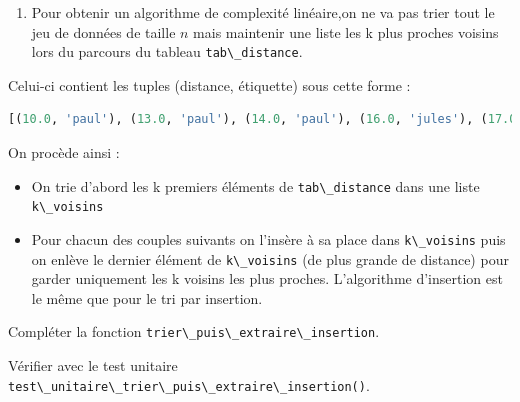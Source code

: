 \documentclass[
  11pt,
]{article}
\newcommand{\passthrough}[1]{#1}
\providecommand{\tightlist}{%
  \setlength{\itemsep}{0pt}\setlength{\parskip}{0pt}}
\newcounter{thme}
\newcounter{def}
\newcounter{cours}
\newcounter{alg}
\begin{document}
\begin{enumerate}
\def\labelenumi{\arabic{enumi}.}
\setcounter{enumi}{4}
\tightlist
\item
  Pour obtenir un algorithme de complexité linéaire,on ne va pas trier
  tout le jeu de données de taille \(n\) mais maintenir une liste les k
  plus proches voisins lors du parcours du tableau
  \passthrough{\lstinline!tab\_distance!}.
\end{enumerate}

Celui-ci contient les tuples (distance, étiquette) sous cette forme :

\begin{lstlisting}[language=Python]
[(10.0, 'paul'), (13.0, 'paul'), (14.0, 'paul'), (16.0, 'jules'), (17.0, 'paul'), ...]
\end{lstlisting}

On procède ainsi :

\begin{itemize}
\tightlist
\item
  On trie d'abord les k premiers éléments de
  \passthrough{\lstinline!tab\_distance!} dans une liste
  \passthrough{\lstinline!k\_voisins!}
\item
  Pour chacun des couples suivants on l'insère à sa place dans
  \passthrough{\lstinline!k\_voisins!} puis on enlève le dernier élément
  de \passthrough{\lstinline!k\_voisins!} (de plus grande de distance)
  pour garder uniquement les k voisins les plus proches. L'algorithme
  d'insertion est le même que pour le tri par insertion.
\end{itemize}

Compléter la fonction
\passthrough{\lstinline!trier\_puis\_extraire\_insertion!}.

Vérifier avec le test unitaire
\passthrough{\lstinline!test\_unitaire\_trier\_puis\_extraire\_insertion()!}.
\end{document}
